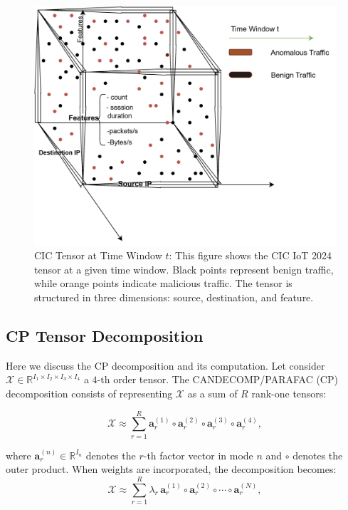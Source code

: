 \documentclass[preprint,12pt,authoryear]{elsarticle}
\begin{document}
\begin{figure}[H]
    \centering
    \includegraphics[width=0.8\linewidth]{Sh (1).png}
    \caption{CIC Tensor at Time Window $t$: This figure shows the CIC IoT 2024 tensor at a given time window. Black points represent benign traffic, while orange points indicate malicious traffic. The tensor is structured in three dimensions: source, destination, and feature.}

    \label{fig:tensor_3d}
\end{figure}

\subsection{CP Tensor Decomposition}
Here we discuss the CP decomposition and its computation. 
Let consider $\mathcal{X} \in \mathbb{R}^{I_1 \times I_2 \times I_3 \times I_4}$ a $4$-th order tensor. The CANDECOMP/PARAFAC (CP) decomposition consists of representing $\mathcal{X}$ as a sum of $R$ rank-one tensors:

\begin{equation}
\mathcal{X} \approx \sum_{r=1}^{R} \mathbf{a}_r^{(1)} \circ \mathbf{a}_r^{(2)} \circ \mathbf{a}_r^{(3)} \circ \mathbf{a}_r^{(4)},
\label{eq:cp-basic}
\end{equation}

\noindent where $\mathbf{a}_r^{(n)} \in \mathbb{R}^{I_n}$ denotes the $r$-th factor vector in mode $n$ and $\circ$ denotes the outer product. When weights are incorporated, the decomposition becomes:
\begin{equation}
\mathcal{X} \approx \sum_{r=1}^{R} \lambda_{r} \, \mathbf{a}_r^{(1)} \circ \mathbf{a}_r^{(2)} \circ \cdots \circ \mathbf{a}_r^{(N)},
\label{eq:cp-lambda}
\end{equation}
\end{document}
